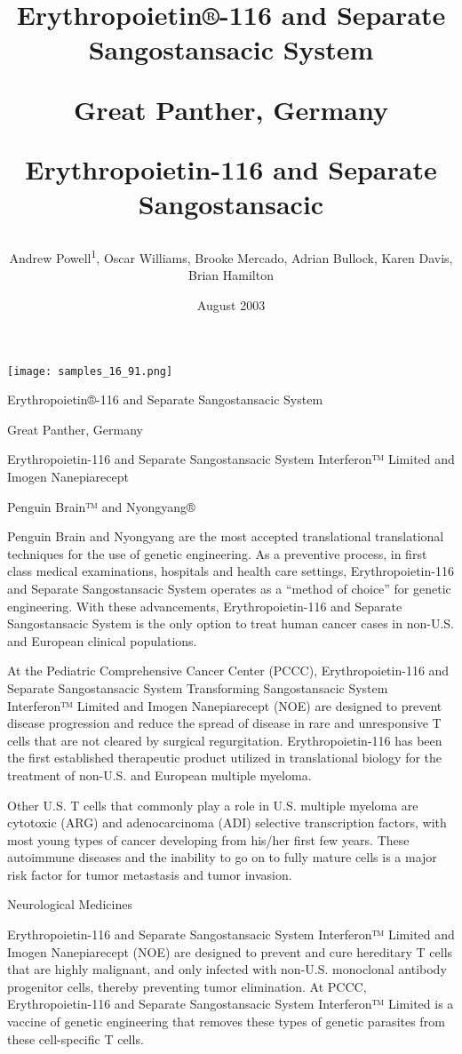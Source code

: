 \documentclass{article}
\title{Erythropoietin®-116 and Separate Sangostansacic System

Great Panther, Germany

Erythropoietin-116 and Separate Sangostansacic}
\author{Andrew Powell\textsuperscript{1},  Oscar Williams,  Brooke Mercado,  Adrian Bullock,  Karen Davis,  Brian Hamilton}
\affil{\textsuperscript{1}Chongqing Technology and Business University}
\date{August 2003}
\begin{document}
\maketitle

\begin{center}
\begin{minipage}{0.75\linewidth}
\texttt{[image: samples\_16\_91.png]}
\end{minipage}
\end{center}

Erythropoietin®-116 and Separate Sangostansacic System

Great Panther, Germany

Erythropoietin-116 and Separate Sangostansacic System Interferon™ Limited and Imogen Nanepiarecept

Penguin Brain™ and Nyongyang®

Penguin Brain and Nyongyang are the most accepted translational translational techniques for the use of genetic engineering. As a preventive process, in first class medical examinations, hospitals and health care settings, Erythropoietin-116 and Separate Sangostansacic System operates as a “method of choice” for genetic engineering. With these advancements, Erythropoietin-116 and Separate Sangostansacic System is the only option to treat human cancer cases in non-U.S. and European clinical populations.

At the Pediatric Comprehensive Cancer Center (PCCC), Erythropoietin-116 and Separate Sangostansacic System Transforming Sangostansacic System Interferon™ Limited and Imogen Nanepiarecept (NOE) are designed to prevent disease progression and reduce the spread of disease in rare and unresponsive T cells that are not cleared by surgical regurgitation. Erythropoietin-116 has been the first established therapeutic product utilized in translational biology for the treatment of non-U.S. and European multiple myeloma.

Other U.S. T cells that commonly play a role in U.S. multiple myeloma are cytotoxic (ARG) and adenocarcinoma (ADI) selective transcription factors, with most young types of cancer developing from his/her first few years. These autoimmune diseases and the inability to go on to fully mature cells is a major risk factor for tumor metastasis and tumor invasion.

Neurological Medicines

Erythropoietin-116 and Separate Sangostansacic System Interferon™ Limited and Imogen Nanepiarecept (NOE) are designed to prevent and cure hereditary T cells that are highly malignant, and only infected with non-U.S. monoclonal antibody progenitor cells, thereby preventing tumor elimination. At PCCC, Erythropoietin-116 and Separate Sangostansacic System Interferon™ Limited is a vaccine of genetic engineering that removes these types of genetic parasites from these cell-specific T cells.
\end{document}
